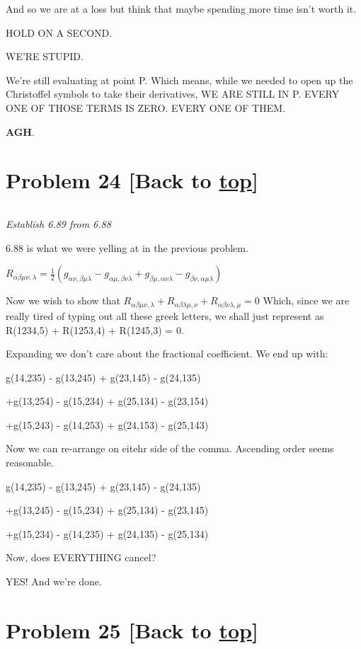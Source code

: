 \documentclass[landscape,letterpaper,10pt,english]{article}
\begin{document}
And so we are at a loss but think that maybe spending more time isn't
worth it.

HOLD ON A SECOND.

WE'RE STUPID.

We're still evaluating at point P. Which means, while we needed to open
up the Christoffel symbols to take their derivatives, WE ARE STILL IN P.
EVERY ONE OF THOSE TERMS IS ZERO. EVERY ONE OF THEM.

\textbf{AGH}.

    \hypertarget{problem-24-back-to-top}{%
\section{\texorpdfstring{Problem 24 {[}Back to
\hyperref[toc]{top}{]}}{Problem 24 {[}Back to {]}}}\label{problem-24-back-to-top}}

\[\label{P24}\]

\emph{Establish 6.89 from 6.88}

    6.88 is what we were yelling at in the previous problem.

\(R_{\alpha\beta\mu\nu,\lambda} = \frac12 (g_{\alpha\nu,\beta\mu\lambda} - g_{\alpha\mu,\beta\nu\lambda} + g_{\beta\mu,\alpha\nu\lambda} - g_{\beta\nu,\alpha\mu\lambda})\)

Now we wish to show that
\(R_{\alpha\beta\mu\nu,\lambda} + R_{\alpha\beta\lambda\mu,\nu} + R_{\alpha\beta\nu\lambda,\mu}= 0\)
Which, since we are really tired of typing out all these greek letters,
we shall just represent as R(1234,5) + R(1253,4) + R(1245,3) = 0.

Expanding we don't care about the fractional coefficient. We end up
with:

g(14,235) - g(13,245) + g(23,145) - g(24,135)

+g(13,254) - g(15,234) + g(25,134) - g(23,154)

+g(15,243) - g(14,253) + g(24,153) - g(25,143)

Now we can re-arrange on eitehr side of the comma. Ascending order seems
reasonable.

g(14,235) - g(13,245) + g(23,145) - g(24,135)

+g(13,245) - g(15,234) + g(25,134) - g(23,145)

+g(15,234) - g(14,235) + g(24,135) - g(25,134)

Now, does EVERYTHING cancel?

YES! And we're done.

    \hypertarget{problem-25-back-to-top}{%
\section{\texorpdfstring{Problem 25 {[}Back to
\hyperref[toc]{top}{]}}{Problem 25 {[}Back to {]}}}\label{problem-25-back-to-top}}
\end{document}
